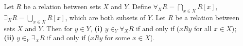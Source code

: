  Let $R$ be a relation between sets $X$ and $Y$. Define $\forall_X R = \bigcap_{x \in X} R[x]$, $\exists_X R = \bigcup_{x \in X} R[x]$, which are both subsets of $Y$.
 Let $R$ be a relation between sets $X$ and $Y$. Then for $y \in Y$, \textbf{(i)} $y \in_Y \forall_X R$ if and only if ($xRy$ for all $x \in X$); \textbf{(ii)} $y \in_Y \exists_X R$ if and only if ($xRy$ for some $x \in X$).

